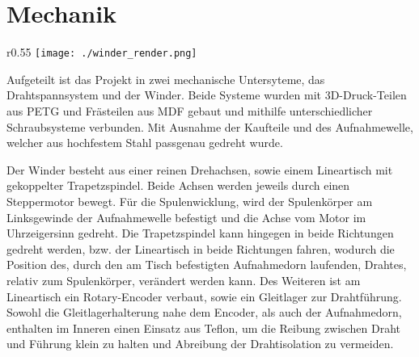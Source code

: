 \section{Mechanik}
\label{sec:Mechanik}




\begin{wrapfigure}{r}{0.55\textwidth}
    \centering
    \texttt{[image: ./winder\_render.png]}
\end{wrapfigure}

Aufgeteilt ist das Projekt in zwei mechanische Untersyteme, das Drahtspannsystem und der Winder.
Beide Systeme wurden mit 3D-Druck-Teilen aus PETG und Frästeilen aus MDF gebaut und mithilfe unterschiedlicher Schraubsysteme verbunden. Mit Ausnahme der Kaufteile und des Aufnahmewelle, welcher aus hochfestem Stahl passgenau gedreht wurde.



Der Winder besteht aus einer reinen Drehachsen, sowie einem Lineartisch mit gekoppelter Trapetzspindel. Beide Achsen werden jeweils durch einen Steppermotor bewegt. Für die Spulenwicklung, wird der Spulenkörper am Linksgewinde der Aufnahmewelle befestigt und die Achse vom Motor im Uhrzeigersinn gedreht. Die Trapetzspindel kann hingegen in beide Richtungen gedreht werden, bzw. der Lineartisch in beide Richtungen fahren, wodurch die Position des, durch den am Tisch befestigten Aufnahmedorn laufenden, Drahtes, relativ zum Spulenkörper, verändert werden kann. Des Weiteren ist am Lineartisch ein Rotary-Encoder verbaut, sowie ein Gleitlager zur Drahtführung. Sowohl die Gleitlagerhalterung nahe dem Encoder, als auch der Aufnahmedorn, enthalten im Inneren einen Einsatz aus Teflon, um die Reibung zwischen Draht und Führung klein zu halten und Abreibung der Drahtisolation zu vermeiden.




